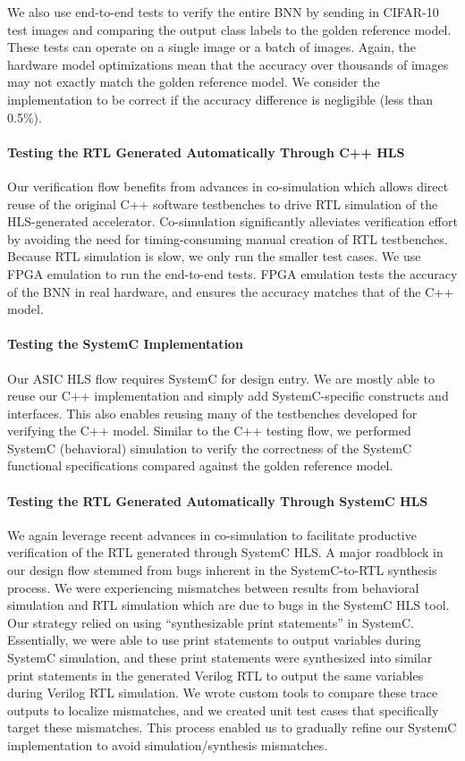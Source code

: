 We also use end-to-end tests to verify the entire BNN by sending in
CIFAR-10 test images and comparing the output class labels to the golden
reference model. These tests can operate on a single image or a batch of
images. Again, the hardware model optimizations mean that the accuracy
over thousands of images may not exactly match the golden reference
model. We consider the implementation to be correct if the accuracy
difference is negligible (less than 0.5\%).

\paragraph{Testing the RTL Generated Automatically Through C++ HLS}
Our verification flow benefits from advances in co-simulation which
allows direct reuse of the original C++ software testbenches to drive RTL
simulation of the HLS-generated accelerator. Co-simulation significantly
alleviates verification effort by avoiding the need for timing-consuming
manual creation of RTL testbenches. Because RTL simulation is slow, we
only run the smaller test cases. We use FPGA emulation to run the
end-to-end tests. FPGA emulation tests the accuracy of the BNN in real
hardware, and ensures the accuracy matches that of the C++ model.

\paragraph{Testing the SystemC Implementation}
Our ASIC HLS flow requires SystemC for design entry. We are mostly able
to reuse our C++ implementation and simply add SystemC-specific
constructs and interfaces. This also enables reusing many of the
testbenches developed for verifying the C++ model. Similar to the C++
testing flow, we performed SystemC (behavioral) simulation to verify the
correctness of the SystemC functional specifications compared against the
golden reference model.

\paragraph{Testing the RTL Generated Automatically Through SystemC HLS}
We again leverage recent advances in co-simulation to facilitate
productive verification of the RTL generated through SystemC HLS. A major
roadblock in our design flow stemmed from bugs inherent in the
SystemC-to-RTL synthesis process. We were experiencing mismatches between
results from behavioral simulation and RTL simulation which are due to
bugs in the SystemC HLS tool. Our strategy relied on using
``synthesizable print statements'' in SystemC. Essentially, we were able
to use print statements to output variables during SystemC simulation,
and these print statements were synthesized into similar print statements
in the generated Verilog RTL to output the same variables during Verilog
RTL simulation. We wrote custom tools to compare these trace outputs to
localize mismatches, and we created unit test cases that specifically
target these mismatches. This process enabled us to gradually refine our
SystemC implementation to avoid simulation/synthesis mismatches.

